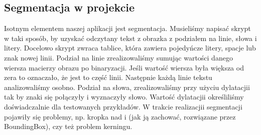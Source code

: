 \subsection{Segmentacja w projekcie}
    Isotnym elementem naszej aplikacji jest segmentacja. Musieliśmy napisać skrypt w taki sposób, by uzyskać odczytany tekst z obrazka z podziałem na linie, słowa i litery. Docelowo skrypt zwraca tablice, która zawiera pojedyńcze litery, spacje lub znak nowej linii.
    Podział na linie zrealizowaliśmy sumując wartości danego wiersza macierzy obrazu po binaryzacji. Jeśli wartość wiersza była większa od zera to oznaczało, że jest to część linii.
    Następnie każdą linie tekstu analizowaliśmy osobno. Podział na słowa, zrealizowaliśmy przy użyciu dylatacjii tak by znaki się połączyły i wyznaczyły słowo. Wartość dylatacjii określiliśmy doświadczalnie dla testowanych przykładów.
    W trakcie realizacjii segmentacji pojawiły się problemy, np. kropka nad i (jak ją zachować, rozwiązane przez BoundingBox), czy też problem kerningu.

